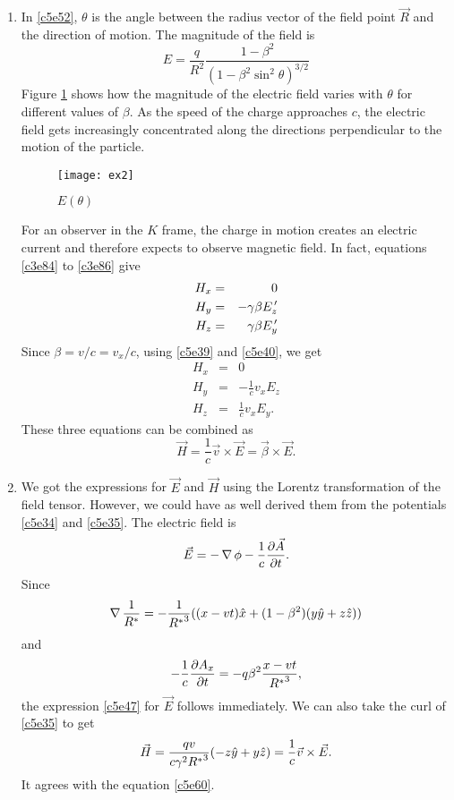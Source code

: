 \begin{enumerate}
\item In \eqref{c5e52}, $\theta$ is the angle between the radius vector of the
field point $\vec{R}$ and the direction of motion. The magnitude of the field
is
\begin{equation}\label{c5e53}
E = \frac{q}{R^2}\frac{1 - \beta^2}{(1 - \beta^2\sin^2\theta)^{3/2}}
\end{equation}
Figure \ref{c5f1} shows how the magnitude of the electric field varies with 
$\theta$ for different values of $\beta$. As the speed of the charge approaches
$c$, the electric field gets increasingly concentrated along the directions
perpendicular to the motion of the particle.
\begin{figure}[!ht]
\texttt{[image: ex2]}
\caption{$E(\theta)$}
\label{c5f1}
\end{figure}
For an observer in the $K$ frame, the charge in motion creates an electric 
current and therefore expects to observe magnetic field. In fact, equations 
\eqref{c3e84} to \eqref{c3e86} give
\begin{eqnarray}
H_x &=& 0 \label{c5e54} \\
H_y &=& -\gamma\beta E^{\,\prime}_z \label{c5e55} \\
H_z &=& \gamma\beta E^{\,\prime}_y \label{c5e56}
\end{eqnarray}
Since $\beta = v/c = v_x/c$, using \eqref{c5e39} and \eqref{c5e40}, we get
\begin{eqnarray}
H_x &=& 0 \label{c5e57} \\
H_y &=& -\frac{1}{c}v_xE_z \label{c5e58} \\
H_z &=& \frac{1}{c}v_xE_y. \label{c5e59}
\end{eqnarray}
These three equations can be combined as
\begin{equation}\label{c5e60}
\vec{H} = \frac{1}{c}\vec{v} \times \vec{E} = \vec{\beta} \times \vec{E}.
\end{equation}

\item We got the expressions for $\vec{E}$ and $\vec{H}$ using the Lorentz
transformation of the field tensor. However, we could have as well derived them
from the potentials \eqref{c5e34} and \eqref{c5e35}. The electric field is
\[
\vec{E} = -\operatorname{\nabla}\phi - \frac{1}{c}\frac{\partial{\vec{A}}}{\partial{t}}.
\]
Since 
\[
\operatorname{\nabla}\frac{1}{R^\ast} = -\frac{1}{{R^\ast}^3}((x-vt)\hat{x} + (1 - \beta^2)
(y\hat{y} + z\hat{z}))
\]
and 
\[
-\frac{1}{c}\frac{\partial{A_x}}{\partial{t}} = -q\beta^2\frac{x - vt}{{R^\ast}^3},
\]
the expression \eqref{c5e47} for $\vec{E}$ follows immediately. We can also 
take the curl of \eqref{c5e35} to get
\[
\vec{H} = \frac{qv}{c\gamma^2 {R^\ast}^3}(-z\hat{y} + y\hat{z})
= \frac{1}{c}\vec{v} \times \vec{E}.
\]
It agrees with the equation \eqref{c5e60}.


\end{enumerate}
